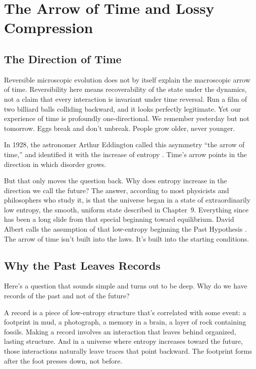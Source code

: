 \section{The Arrow of Time and Lossy Compression}

\subsection{The Direction of Time}

Reversible microscopic evolution does not by itself explain the macroscopic arrow of time. Reversibility here means recoverability of the state under the dynamics, not a claim that every interaction is invariant under time reversal. Run a film of two billiard balls colliding backward, and it looks perfectly legitimate. Yet our experience of time is profoundly one-directional. We remember yesterday but not tomorrow. Eggs break and don't unbreak. People grow older, never younger.

In 1928, the astronomer Arthur Eddington called this asymmetry ``the arrow of time,'' and identified it with the increase of entropy \cite{eddington1928}. Time's arrow points in the direction in which disorder grows.

But that only moves the question back. Why does entropy increase in the direction we call the future? The answer, according to most physicists and philosophers who study it, is that the universe began in a state of extraordinarily low entropy, the smooth, uniform state described in Chapter~9. Everything since has been a long slide from that special beginning toward equilibrium. David Albert calls the assumption of that low-entropy beginning the Past Hypothesis \cite{albert2000}. The arrow of time isn't built into the laws. It's built into the starting conditions.

\subsection{Why the Past Leaves Records}

Here's a question that sounds simple and turns out to be deep. Why do we have records of the past and not of the future?

A record is a piece of low-entropy structure that's correlated with some event: a footprint in mud, a photograph, a memory in a brain, a layer of rock containing fossils. Making a record involves an interaction that leaves behind organized, lasting structure. And in a universe where entropy increases toward the future, those interactions naturally leave traces that point backward. The footprint forms after the foot presses down, not before.


